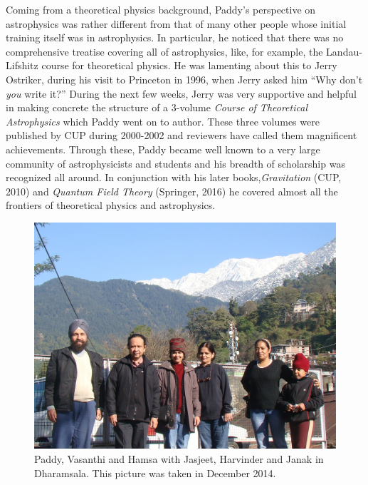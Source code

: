 \documentclass[prd, preprint, longbibliography, 12pt]{revtex4-2}
\begin{document}
Coming from a theoretical physics background, Paddy's perspective on
astrophysics was rather different from that of many other people whose
initial training itself was in astrophysics.
In particular, he noticed that there was no comprehensive treatise
covering all of astrophysics, like, for example, the Landau-Lifshitz
course for theoretical physics.
He was lamenting about this to Jerry Ostriker, during his visit to
Princeton in 1996, when  Jerry asked him ``Why don’t \textit{you}
write it?''
During the next few weeks, Jerry was very supportive and helpful in
making concrete the structure of a 3-volume \textit{Course of
  Theoretical Astrophysics} which Paddy went on to author.
These three volumes were published by CUP during 2000-2002 and
reviewers have called them magnificent achievements.
Through these, Paddy became well known to a very large community of
astrophysicists and students  and his breadth of scholarship was
recognized all around.
In conjunction with  his  later books,\textit{Gravitation} (CUP, 2010)
and  \textit{Quantum Field Theory} (Springer, 2016)  he covered almost
all the frontiers of theoretical physics and astrophysics. 
\begin{figure}
  \includegraphics[width=5truein]{paddy-dharamsala.jpg}
  \caption*{Paddy, Vasanthi and Hamsa with Jasjeet, Harvinder and Janak
    in Dharamsala.  This picture was taken in December 2014.}
\end{figure}
\end{document}
